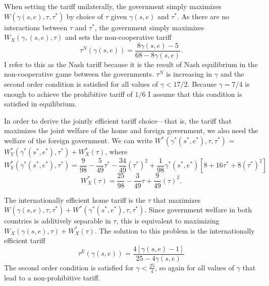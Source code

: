 \documentclass[12pt]{article}
\newcommand{\ve}{\theta}
\newcommand{\ga}{\gamma}
\begin{document}
When setting the tariff unilaterally, the government simply maximizes $W(\ga(s,e),\tau, \tau^*)$ by choice of $\tau$ given $\ga(s,e)$ and $\tau^*$. As there are no interactions between $\tau$ and $\tau^*$, the government simply maximizes $W_X(\ga,(s,e),\tau)$ and sets the non-cooperative tariff
\begin{equation}
  \tau^N(\ga(s,e)) = \frac{8\ga(s,e)-5}{68-8\ga(s,e)}.
  \label{eq:nash}
\end{equation}
I refer to this as the Nash tariff because it is the result of Nash equilibrium in the non-cooperative game between the governments. $\tau^N$ is increasing in $\ga$ and the second order condition is satisfied for all values of $\ga < 17/2$. Because $\ga = 7/4$ is enough to achieve the prohibitive tariff of $1/6$ I assume that this condition is satisfied in equilibrium. 

In order to derive the jointly efficient tariff choice---that is, the tariff that maximizes the joint welfare of the home and foreign government, we also need the welfare of the foreign government. We can write $W^*(\ga^*(s^*,e^*),\tau,\tau^*)$ = $W_Y^*(\ga^*(s^*,e^*),\tau^*) + W_X^*(\tau)$, where
\[
  W_Y^*(\ga^*(s^*,e^*),\tau^*) = \frac{9}{98} - \frac{5}{49}\tau^* - \frac{34}{49}(\tau^*)^2 +\frac{1}{98}\ga^*(s^*,e^*)\left[ 8 + 16\tau^* + 8(\tau^*)^2 \right]
\]
\[
  W_X^*(\tau) = \frac{25}{98} - \frac{3}{49}\tau + \frac{9}{49}(\tau)^2 .
\]

The internationally efficient home tariff is the $\tau$ that maximizes $W(\ga(s,e),\tau,\tau^*) + W^*(\ga^*(s^*,e^*),\tau,\tau^*)$. Since government welfare in both countries is additively separable in $\tau$, this is equivalent to maximizing $W_X(\ga(s,e),\tau) + W_X^*(\tau)$. The solution to this problem is the internationally efficient tariff
\begin{equation}
  \tau^E(\ga(s,e)) = \frac{4\left[\ga(s,e)-1\right]}{25-4\ga(s,e)}
  \label{eq:eff}
\end{equation}
The second order condition is satisfied for $\ga < \frac{25}{4}$, so again for all values of $\ga$ that lead to a non-prohibitive tariff.

\end{document}
